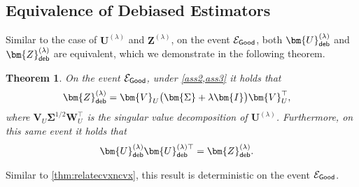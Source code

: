 \documentclass[10pt]{article}
\renewcommand{\t}{^{\top}}
\newtheorem{theorem}{Theorem}
\theoremstyle{definition}
\begin{document}
\subsection{Equivalence of Debiased Estimators}
\label{sec:equivdebiased}
Similar to the case of $\bm{U}^{(\lambda)}$ and $\bm{Z}^{(\lambda)}$, on the event $\mathcal{E}_{{\sf Good}}$, both $\bm{U}_{{\sf deb}}^{(\lambda)}$ and $\bm{Z}^{(\lambda)}_{{\sf deb}}$ are equivalent, which we demonstrate in the following theorem.   
\begin{theorem} \label{thm:udebzdeb}    On the event $\mathcal{E}_{{\sf Good}}$, under \cref{ass2,ass3} it holds that 
   \begin{align}
         \bm{Z}_{{\sf deb}}^{(\lambda)} &= \bm{V}_{U} \big( \bm{ \Sigma}+ \lambda \bm{I} \big) \bm{V}_U\t, \label{eq:zdebidentity1}
     \end{align}
     where $\bm{V}_U \bm{\Sigma}^{1/2} \bm{W}_U\t$ is the singular value decomposition of $\bm{U}^{(\lambda)}$.   Furthermore, on this same event it holds that 
 \begin{align}
     \bm{U}_{{\sf deb}}^{(\lambda)} \bm{U}_{{\sf deb}}^{(\lambda)\top} &= \bm{Z}_{{\sf deb}}^{(\lambda)}. \label{eq:zdebidentity2}
     \end{align}
\end{theorem}
Similar to \cref{thm:relatecvxncvx}, this result is deterministic on the event $\mathcal{E}_{{\sf Good}}$.  
\end{document}
